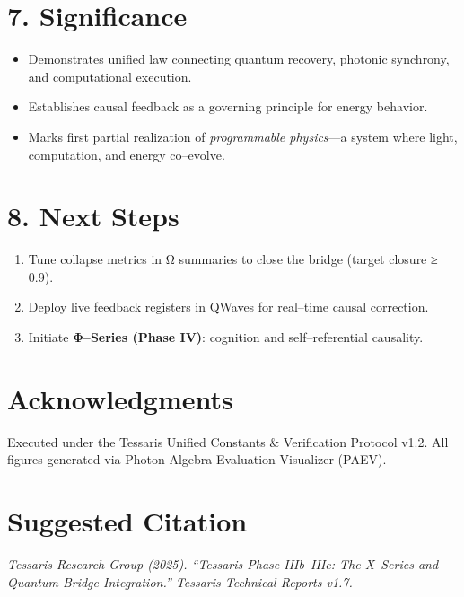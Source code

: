 \documentclass[11pt,a4paper]{article}
\begin{document}
\section{7. Significance}
\begin{itemize}
  \item Demonstrates unified law connecting quantum recovery, photonic synchrony, and computational execution.
  \item Establishes causal feedback as a governing principle for energy behavior.
  \item Marks first partial realization of \textit{programmable physics}—a system where light, computation, and energy co--evolve.
\end{itemize}

\section{8. Next Steps}
\begin{enumerate}
  \item Tune collapse metrics in Ω summaries to close the bridge (target closure ≥ 0.9).
  \item Deploy live feedback registers in QWaves for real--time causal correction.
  \item Initiate \textbf{Φ–Series (Phase IV)}: cognition and self--referential causality.
\end{enumerate}

\section*{Acknowledgments}
Executed under the Tessaris Unified Constants \& Verification Protocol v1.2.  
All figures generated via Photon Algebra Evaluation Visualizer (PAEV).

\section*{Suggested Citation}
\textit{Tessaris Research Group (2025). ``Tessaris Phase IIIb–IIIc: The X–Series and Quantum Bridge Integration.'' Tessaris Technical Reports v1.7.}
\end{document}
